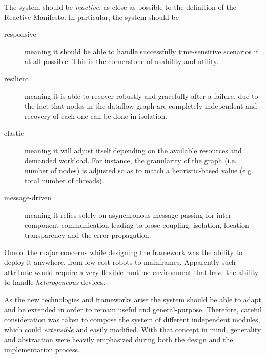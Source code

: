\documentclass[sigplan,screen,review,anonymous]{acmart}
\begin{document}
The system should be \textit{reactive}, as close as possible to the definition
of the Reactive Manifesto. In particular,
the system should be
\begin{description}
  \item[responsive] meaning it should be able to handle successfully time-sensitive scenarios if at all possible.
  This is the cornerstone of usability and utility.
  \item[resilient] meaning it is able to recover robustly and gracefully after
  a failure, due to the fact that nodes in the dataflow graph are completely
  independent and recovery of each one can be done in isolation.


  \item[elastic] meaning it will adjust itself depending on the available resources
  and demanded workload. For instance, the granularity of the graph (i.e. number of nodes)
  is adjusted so as to match a heuristic-based value (e.g. total number of threads).

  \item[message-driven] meaning it relies solely on asynchronous message-passing
  for inter-component communication leading to loose coupling, isolation, location
  transparency and the error propagation.
\end{description}

One of the major concerns while designing the framework was the ability to
deploy it anywhere, from low-cost robots to mainframes. Apparently such
attribute would require a very flexible runtime environment that have the ability to handle
\textit{heterogeneous} devices.

As the new technologies and frameworks arise the system should be able to adapt
and be extended in order to remain useful and general-purpose.
Therefore, careful consideration was taken to compose the system of different
independent modules, which could \textit{extensible} and easily modified. With that concept
in mind, generality and abstraction were heavily emphasized during both the design
and the implementation process.
\end{document}
